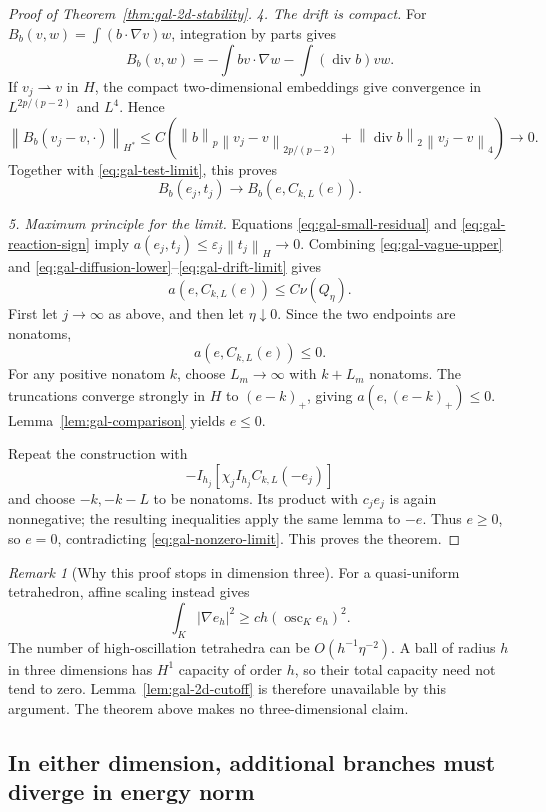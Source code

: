 \documentclass[11pt,a4paper]{article}
\newcommand{\norm}[1]{\left\lVert#1\right\rVert}
\newcommand{\abs}[1]{\left\lvert#1\right\rvert}
\theoremstyle{definition}
\theoremstyle{remark}
\newtheorem{remark}[theorem]{Remark}
\numberwithin{equation}{section}
\begin{document}
\begin{proof}[Proof of Theorem~\ref{thm:gal-2d-stability}]
\emph{4. The drift is compact.}
For $B_b(v,w)=\int(b\cdot\nabla v)w$, integration by parts gives
\[
 B_b(v,w)=-\int bv\cdot\nabla w-\int(\operatorname{div}b)vw.
\]
If $v_j\rightharpoonup v$ in $H$, the compact two-dimensional embeddings give convergence in $L^{2p/(p-2)}$ and $L^4$. Hence
\[
 \norm{B_b(v_j-v,\cdot)}_{H^*}
 \le C\left(\norm{b}_p\norm{v_j-v}_{2p/(p-2)}
    +\norm{\operatorname{div}b}_2\norm{v_j-v}_4\right)\longrightarrow0.
\]
Together with \eqref{eq:gal-test-limit}, this proves
\begin{equation}\label{eq:gal-drift-limit}
 B_b(e_j,t_j)\longrightarrow B_b(e,C_{k,L}(e)).
\end{equation}

\emph{5. Maximum principle for the limit.}
Equations \eqref{eq:gal-small-residual} and \eqref{eq:gal-reaction-sign} imply $a(e_j,t_j)\le\varepsilon_j\norm{t_j}_H\to0$. Combining \eqref{eq:gal-vague-upper} and \eqref{eq:gal-diffusion-lower}--\eqref{eq:gal-drift-limit} gives
\[
 a(e,C_{k,L}(e))\le C\nu(Q_\eta).
\]
First let $j\to\infty$ as above, and then let $\eta\downarrow0$. Since the two endpoints are nonatoms,
\[
 a(e,C_{k,L}(e))\le0.
\]
For any positive nonatom $k$, choose $L_m\to\infty$ with $k+L_m$ nonatoms. The truncations converge strongly in $H$ to $(e-k)_+$, giving $a(e,(e-k)_+)\le0$. Lemma~\ref{lem:gal-comparison} yields $e\le0$.

Repeat the construction with
\[
 -I_{h_j}\left[\chi_j I_{h_j}C_{k,L}(-e_j)\right]
\]
and choose $-k,-k-L$ to be nonatoms. Its product with $c_je_j$ is again nonnegative; the resulting inequalities apply the same lemma to $-e$. Thus $e\ge0$, so $e=0$, contradicting \eqref{eq:gal-nonzero-limit}. This proves the theorem.
\end{proof}

\begin{remark}[Why this proof stops in dimension three]
For a quasi-uniform tetrahedron, affine scaling instead gives
\[
 \int_K\abs{\nabla e_h}^2\ge ch(\operatorname{osc}_K e_h)^2.
\]
The number of high-oscillation tetrahedra can be $O(h^{-1}\eta^{-2})$. A ball of radius $h$ in three dimensions has $H^1$ capacity of order $h$, so their total capacity need not tend to zero. Lemma~\ref{lem:gal-2d-cutoff} is therefore unavailable by this argument. The theorem above makes no three-dimensional claim.
\end{remark}

\subsection{In either dimension, additional branches must diverge in energy norm}
\end{document}
